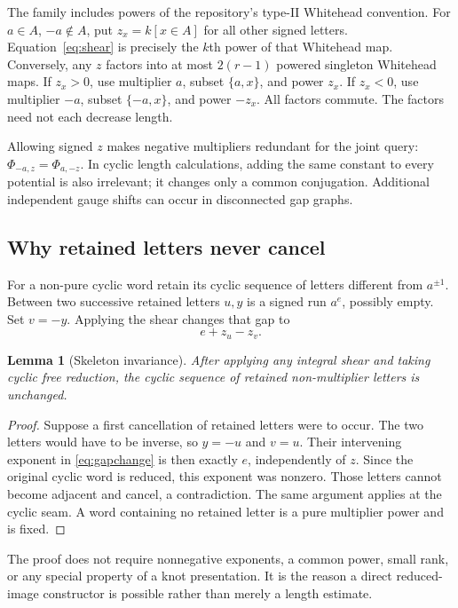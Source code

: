 \documentclass[11pt,letterpaper]{article}
\newtheorem{lemma}[theorem]{Lemma}
\theoremstyle{definition}
\theoremstyle{remark}\newtheorem{remark}[theorem]{Remark}
\begin{document}
The family includes powers of the repository's type-II Whitehead convention.
For $a\in A$, $-a\notin A$, put $z_x=k[x\in A]$ for all other signed letters.
Equation~\eqref{eq:shear} is precisely the $k$th power of that Whitehead
map. Conversely, any $z$ factors into at most $2(r-1)$ powered singleton
Whitehead maps. If $z_x>0$, use multiplier $a$, subset $\{a,x\}$, and power
$z_x$. If $z_x<0$, use multiplier $-a$, subset $\{-a,x\}$, and power $-z_x$.
All factors commute. The factors need not each decrease length.

Allowing signed $z$ makes negative multipliers redundant for the joint query:
$\Phi_{-a,z}=\Phi_{a,-z}$. In cyclic length calculations, adding the same
constant to every potential is also irrelevant; it changes only a common
conjugation. Additional independent gauge shifts can occur in disconnected
gap graphs.

\subsection{Why retained letters never cancel}

For a non-pure cyclic word retain its cyclic sequence of letters different
from $a^{\pm1}$. Between two successive retained letters $u,y$ is a signed
run $a^e$, possibly empty. Set $v=-y$. Applying the shear changes that gap to
\begin{equation}
 e+z_u-z_v.
 \label{eq:gapchange}
\end{equation}

\begin{lemma}[Skeleton invariance]
After applying any integral shear and taking cyclic free reduction, the
cyclic sequence of retained non-multiplier letters is unchanged.
\end{lemma}
\begin{proof}
Suppose a first cancellation of retained letters were to occur. The two
letters would have to be inverse, so $y=-u$ and $v=u$. Their intervening
exponent in \eqref{eq:gapchange} is then exactly $e$, independently of $z$.
Since the original cyclic word is reduced, this exponent was nonzero.
Those letters cannot become adjacent and cancel, a contradiction. The same
argument applies at the cyclic seam. A word containing no retained letter
is a pure multiplier power and is fixed.
\end{proof}

The proof does not require nonnegative exponents, a common power, small rank,
or any special property of a knot presentation. It is the reason a direct
reduced-image constructor is possible rather than merely a length estimate.
\end{document}
